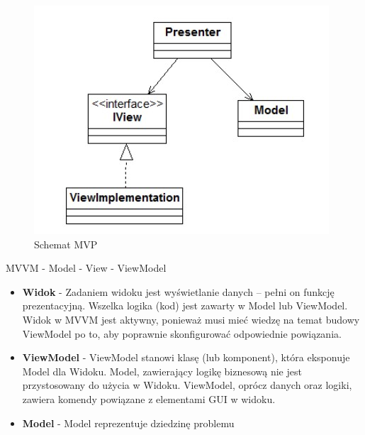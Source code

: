 \documentclass[a4paper,12pt,oneside]{book}
\begin{document}
                \begin{figure}[h]
                    \centering
                    \includegraphics[width=\textwidth/2]{images/mvp.jpg}
                    \caption{Schemat MVP}
                    \label{fig:twojastara4}
                \end{figure}
                MVVM - Model - View - ViewModel
                \begin{itemize}
                    \item \textbf{Widok} - Zadaniem widoku jest wyświetlanie danych – pełni on funkcję 
                    prezentacyjną. Wszelka logika (kod) jest zawarty w Model lub 
                    ViewModel. Widok w MVVM jest aktywny, ponieważ musi mieć wiedzę 
                    na temat budowy ViewModel po to, aby poprawnie skonfigurować 
                    odpowiednie powiązania.
                    \item \textbf{ViewModel} - ViewModel stanowi klasę (lub komponent), która eksponuje Model dla 
                    Widoku. Model, zawierający logikę biznesową nie jest przystosowany do 
                    użycia w Widoku. ViewModel, oprócz danych oraz logiki, zawiera 
                    komendy powiązane z elementami GUI w widoku.
                    \item \textbf{Model} - Model reprezentuje dziedzinę problemu
                \end{itemize}
\end{document}
